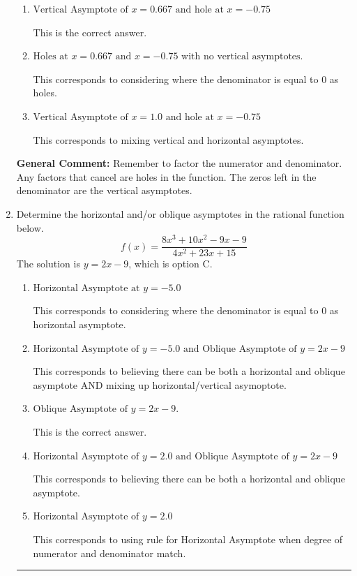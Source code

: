 \documentclass{extbook}[14pt]
\newcommand{\litem}[1]{\item #1

\rule{\textwidth}{0.4pt}}
\begin{document}
\begin{enumerate}
{\begin{enumerate}[label=\Alph*.]
This corresponds to not factoring out the hole.
\item \( \text{Vertical Asymptote of } x = 0.667 \text{ and hole at } x = -0.75 \)

This is the correct answer.
\item \( \text{Holes at } x = 0.667 \text{ and } x = -0.75 \text{ with no vertical asymptotes.} \)

This corresponds to considering where the denominator is equal to 0 as holes.
\item \( \text{Vertical Asymptote of } x = 1.0 \text{ and hole at } x = -0.75 \)

This corresponds to mixing vertical and horizontal asymptotes.
\end{enumerate}

\textbf{General Comment:} Remember to factor the numerator and denominator. Any factors that cancel are holes in the function. The zeros left in the denominator are the vertical asymptotes.
}
\litem{
Determine the horizontal and/or oblique asymptotes in the rational function below.
\[ f(x) = \frac{8x^{3} +10 x^{2} -9 x -9}{4x^{2} +23 x + 15} \]The solution is \( y = 2x -9 \), which is option C.\begin{enumerate}[label=\Alph*.]
\item \( \text{Horizontal Asymptote at } y = -5.0 \)

This corresponds to considering where the denominator is equal to 0 as horizontal asymptote.
\item \( \text{Horizontal Asymptote of } y = -5.0 \text{ and Oblique Asymptote of } y = 2x -9 \)

This corresponds to believing there can be both a horizontal and oblique asymptote AND mixing up horizontal/vertical asymoptote.
\item \( \text{Oblique Asymptote of } y = 2x -9. \)

This is the correct answer.
\item \( \text{Horizontal Asymptote of } y = 2.0 \text{ and Oblique Asymptote of } y = 2x -9 \)

This corresponds to believing there can be both a horizontal and oblique asymptote.
\item \( \text{Horizontal Asymptote of } y = 2.0  \)

This corresponds to using rule for Horizontal Asymptote when degree of numerator and denominator match.
\end{enumerate}

}
\end{enumerate}
\end{document}

